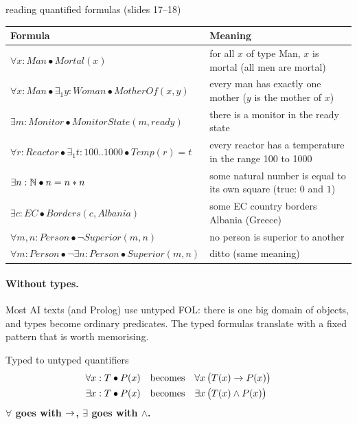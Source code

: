 \begin{nbexample}{reading quantified formulas (slides 17--18)}
\small
\begin{tabularx}{\linewidth}{@{}>{\raggedright\arraybackslash}p{6.2cm} X@{}}
\toprule
\textbf{Formula} & \textbf{Meaning} \\
\midrule
$\forall x : \mathit{Man} \bullet \mathit{Mortal}(x)$ & for all $x$ of type Man, $x$ is mortal (all men are mortal) \\
$\forall x : \mathit{Man} \bullet \exists_1 y : \mathit{Woman} \bullet \mathit{MotherOf}(x, y)$ & every man has exactly one mother ($y$ is the mother of $x$) \\
$\exists m : \mathit{Monitor} \bullet \mathit{MonitorState}(m, \mathit{ready})$ & there is a monitor in the ready state \\
$\forall r : \mathit{Reactor} \bullet \exists_1 t : 100..1000 \bullet \mathit{Temp}(r) = t$ & every reactor has a temperature in the range 100 to 1000 \\
$\exists n : \mathbb{N} \bullet n = n * n$ & some natural number is equal to its own square (true: $0$ and $1$) \\
$\exists c : \mathit{EC} \bullet \mathit{Borders}(c, \mathit{Albania})$ & some EC country borders Albania (Greece) \\
$\forall m, n : \mathit{Person} \bullet \neg \mathit{Superior}(m, n)$ & no person is superior to another \\
$\forall m : \mathit{Person} \bullet \neg \exists n : \mathit{Person} \bullet \mathit{Superior}(m, n)$ & ditto (same meaning) \\
\bottomrule
\end{tabularx}
\end{nbexample}

\paragraph{Without types.} Most AI texts (and Prolog) use untyped FOL: there is one big
domain of objects, and types become ordinary predicates. The typed formulas translate
with a fixed pattern that is worth memorising.

\begin{nbfact}{Typed to untyped quantifiers}
\notinslides
\begin{align*}
\forall x : T \bullet P(x) \quad &\text{becomes}\quad \forall x\,\big(T(x) \rightarrow P(x)\big) \\
\exists x : T \bullet P(x) \quad &\text{becomes}\quad \exists x\,\big(T(x) \land P(x)\big)
\end{align*}
\textbf{$\forall$ goes with $\rightarrow$, $\exists$ goes with $\land$.}
\end{nbfact}

